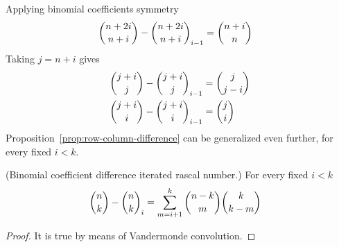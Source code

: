 Applying binomial coefficients symmetry
\begin{align*}
    \binom{n+2i}{n+i} - \binom{n+2i}{n+i}_{i-1} &= \binom{n+i}{n}
\end{align*}
Taking $j=n+i$ gives
\begin{align*}
    \binom{j+i}{j} - \binom{j+i}{j}_{i-1} &= \binom{j}{j-i} \\
    \binom{j+i}{i} - \binom{j+i}{i}_{i-1} &= \binom{j}{i}
\end{align*}
Proposition~\eqref{prop:row-column-difference} can be generalized even further, for every fixed $i < k$.
\begin{proposition}
(Binomial coefficient difference iterated rascal number.)
    For every fixed $i < k$
    \label{prop:row-column-difference-general}
    \begin{align*}
        \binom{n}{k} - \binom{n}{k}_{i} &= \sum_{m=i+1}^{k} \binom{n-k}{m} \binom{k}{k-m}
    \end{align*}
    \begin{proof}
        It is true by means of Vandermonde convolution.
    \end{proof}
\end{proposition}
